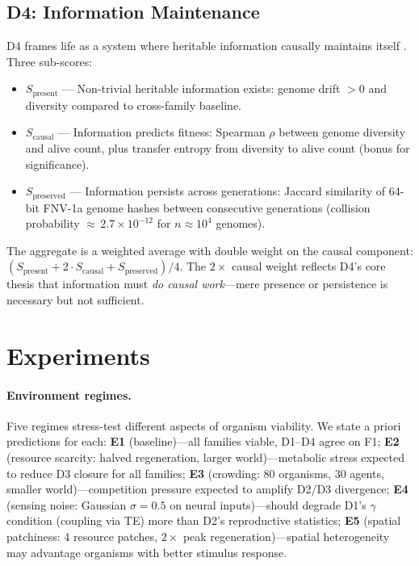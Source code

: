 \documentclass[letterpaper]{article}
\begin{document}
\subsection{D4: Information Maintenance}

D4 frames life as a system where heritable information causally maintains
itself \citep{schrodinger_1944_what, walker_2013_algorithmic}.
Three sub-scores:

\begin{itemize}
\item $S_\text{present}$ --- Non-trivial heritable information exists:
  genome drift $> 0$ and diversity compared to cross-family baseline.
\item $S_\text{causal}$ --- Information predicts fitness: Spearman
  $\rho$ between genome diversity and alive count, plus transfer
  entropy from diversity to alive count (bonus for significance).
\item $S_\text{preserved}$ --- Information persists across generations:
  Jaccard similarity of 64-bit FNV-1a genome hashes between consecutive
  generations (collision probability ${\approx}\,2.7 \times 10^{-12}$
  for $n \approx 10^4$ genomes).
\end{itemize}

The aggregate is a weighted average with double weight on the causal
component: $(S_\text{present} + 2 \cdot S_\text{causal} +
S_\text{preserved}) / 4$.  The $2\times$ causal weight reflects
D4's core thesis that information must \emph{do causal work}---mere
presence or persistence is necessary but not sufficient.

\section{Experiments}
\label{sec:experiments}

\paragraph{Environment regimes.}
Five regimes stress-test different aspects of organism viability.
We state a priori predictions for each:
\textbf{E1} (baseline)---all families viable, D1--D4 agree on F1;
\textbf{E2} (resource scarcity: halved regeneration, larger world)---metabolic
stress expected to reduce D3 closure for all families;
\textbf{E3} (crowding: 80 organisms, 30 agents, smaller world)---competition
pressure expected to amplify D2/D3 divergence;
\textbf{E4} (sensing noise: Gaussian $\sigma=0.5$ on neural inputs)---should
degrade D1's $\gamma$ condition (coupling via TE) more than D2's
reproductive statistics;
\textbf{E5} (spatial patchiness: 4 resource patches, $2\times$ peak
regeneration)---spatial heterogeneity may advantage organisms with
better stimulus response.
\end{document}
